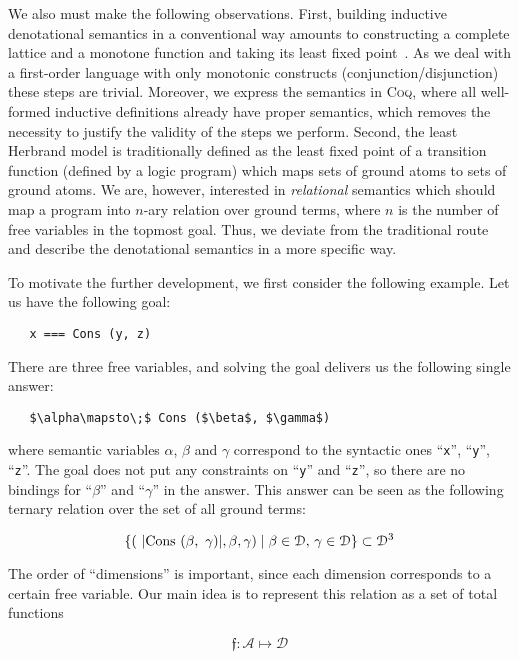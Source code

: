 We also must make the following observations. First, building inductive denotational semantics in a conventional way amounts to
constructing a complete lattice and a monotone function and taking its least fixed point~\cite{TarskiKnaster}.
As we deal with a first-order language with only monotonic constructs (conjunction/disjunction) these steps
are trivial. Moreover, we express the semantics in \textsc{Coq}, where all well-formed inductive definitions already
have proper semantics, which removes the necessity to justify the validity of the steps we perform. Second, 
the least Herbrand model is traditionally defined as the least fixed point of a transition function (defined by a logic program)
which maps sets of ground atoms to sets of ground atoms. We are, however, interested in \emph{relational} semantics which
should map a program into $n$-ary relation over ground terms, where $n$ is the number of free variables in the topmost
goal. Thus, we deviate from the traditional route and describe the denotational semantics in a more specific way.

To motivate the further development, we first consider the following example. Let us have the following goal:

\begin{lstlisting}
   x === Cons (y, z)
\end{lstlisting}

There are three free variables, and solving the goal delivers us the following single answer:

\begin{lstlisting}
   $\alpha\mapsto\;$ Cons ($\beta$, $\gamma$)
\end{lstlisting}

where semantic variables $\alpha$, $\beta$ and $\gamma$ correspond to the syntactic ones ``\lstinline|x|'', ``\lstinline|y|'', ``\lstinline|z|''. The
goal does not put any constraints on ``\lstinline|y|'' and ``\lstinline|z|'', so there are no bindings for ``$\beta$'' and ``$\gamma$'' in the answer.
This answer can be seen as the following ternary relation over the set of all ground terms:

\[
\{(\mbox{\lstinline|Cons ($\beta$, $\,\gamma$)|}, \beta, \gamma) \mid \beta\in\mathcal{D},\,\gamma\in\mathcal{D}\}\subset\mathcal{D}^3
\]

The order of ``dimensions'' is important, since each dimension corresponds to a certain free variable. Our main idea is to represent this relation as a set of total
functions 

\[
\mathfrak{f}:\mathcal{A}\mapsto\mathcal{D}
\]

